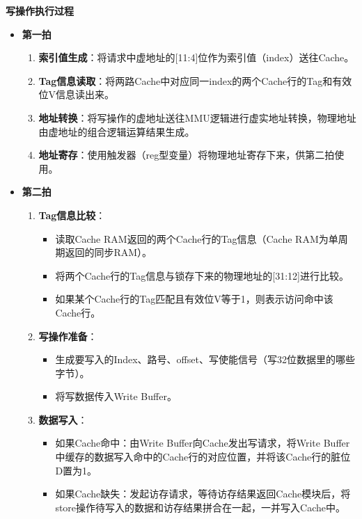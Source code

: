 \textbf{写操作执行过程}

\begin{itemize}
\item
  \textbf{第一拍}

  \begin{enumerate}
  \def\labelenumi{\arabic{enumi}.}
  \tightlist
  \item
    \textbf{索引值生成}：将请求中虚地址的{[}11:4{]}位作为索引值（index）送往Cache。
  \item
    \textbf{Tag信息读取}：将两路Cache中对应同一index的两个Cache行的Tag和有效位V信息读出来。
  \item
    \textbf{地址转换}：将写操作的虚地址送往MMU逻辑进行虚实地址转换，物理地址由虚地址的组合逻辑运算结果生成。
  \item
    \textbf{地址寄存}：使用触发器（reg型变量）将物理地址寄存下来，供第二拍使用。
  \end{enumerate}
\item
  \textbf{第二拍}

  \begin{enumerate}
  \def\labelenumi{\arabic{enumi}.}
  \tightlist
  \item
    \textbf{Tag信息比较}：

    \begin{itemize}
    \tightlist
    \item
      读取Cache RAM返回的两个Cache行的Tag信息（Cache RAM为单周期返回的同步RAM）。
    \item
      将两个Cache行的Tag信息与锁存下来的物理地址的{[}31:12{]}进行比较。
    \item
      如果某个Cache行的Tag匹配且有效位V等于1，则表示访问命中该Cache行。
    \end{itemize}
  \item
    \textbf{写操作准备}：

    \begin{itemize}
    \tightlist
    \item
      生成要写入的Index、路号、offset、写使能信号（写32位数据里的哪些字节）。
    \item
      将写数据传入Write Buffer。
    \end{itemize}
  \item
    \textbf{数据写入}：

    \begin{itemize}
    \tightlist
    \item
      如果Cache命中：由Write Buffer向Cache发出写请求，将Write Buffer中缓存的数据写入命中的Cache行的对应位置，并将该Cache行的脏位D置为1。
    \item
      如果Cache缺失：发起访存请求，等待访存结果返回Cache模块后，将store操作待写入的数据和访存结果拼合在一起，一并写入Cache中。
    \end{itemize}
  \end{enumerate}
\end{itemize}

